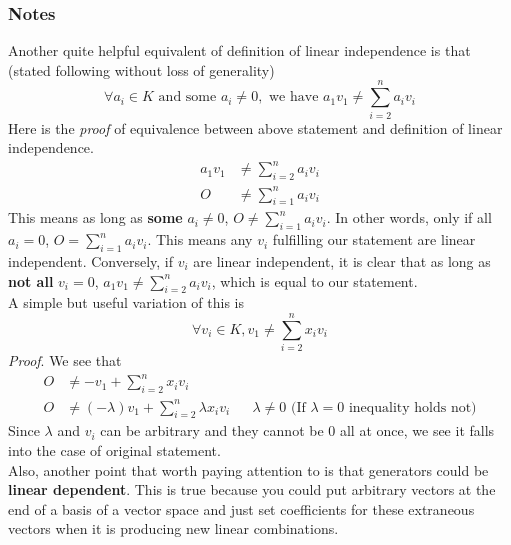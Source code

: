 \documentclass[11pt]{article}
\begin{document}
\subsubsection{Notes}
\label{sec:orgf6fc502}
\label{org9a76a6d}
Another quite helpful equivalent of definition of linear independence is that (stated following without loss of generality)
$$\forall a_i\in K \text{ and some } a_i\not = 0, \text{ we have }a_1 v_1\not =\sum\limits_{i=2}^n a_iv_i$$
Here is the \emph{proof} of equivalence between above statement and definition of linear independence.\\
$$\begin{aligned}
a_1 v_1&\not =\sum\limits_{i=2}^n a_iv_i\\
O &\not = \sum\limits_{i=1}^n a_iv_i
\end{aligned}$$
This means as long as \textbf{some} \(a_i\not =0\), \(O \not = \sum\limits_{i=1}^n a_iv_i\). In other words, only if all \(a_i=0\), \(O = \sum\limits_{i=1}^n a_iv_i\). This means any \(v_i\) fulfilling our statement are linear independent. Conversely, if \(v_i\) are linear independent, it is clear that as long as \textbf{not all} \(v_i=0\), \(a_1 v_1\not =\sum\limits_{i=2}^n a_iv_i\), which is equal to our statement.\\
A simple but useful variation of this is
$$\forall v_i\in K, v_1\not = \sum\limits_{i=2}^n x_iv_i$$
\emph{Proof}. We see that
$$\begin{aligned}
O&\not = -v_1+\sum\limits_{i=2}^n x_iv_i\\
O&\not = (-\lambda)v_1+\sum\limits_{i=2}^n \lambda x_iv_i && \lambda\not = 0\text{ (If } \lambda=0 \text{ inequality holds not)}
\end{aligned}$$
Since \(\lambda\) and \(v_i\) can be arbitrary and they cannot be \(0\) all at once, we see it falls into the case of original statement.\\
Also, another point that worth paying attention to is that generators could be \textbf{linear dependent}. This is true because you could put arbitrary vectors at the end of a basis of a vector space and just set coefficients for these extraneous vectors when it is producing new linear combinations.
\end{document}
